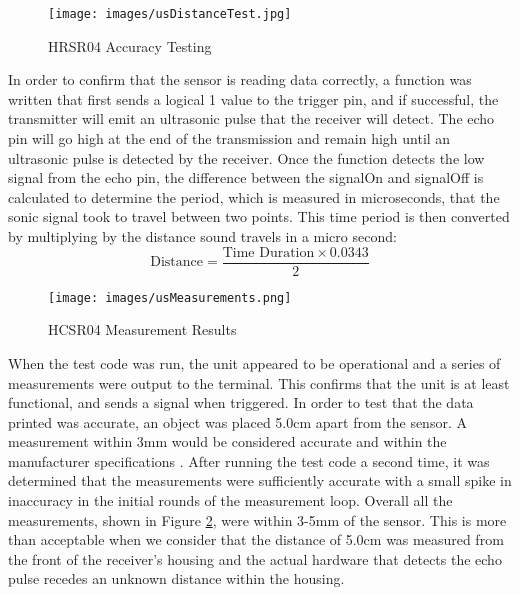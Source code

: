 \documentclass[12pt]{article} %
\begin{document}
\begin{figure}[H]
  \centering
  \texttt{[image: images/usDistanceTest.jpg]}
  \caption{HRSR04 Accuracy Testing}
  \label{fig:accuracy test}
\end{figure}

\noindent In order to confirm that the sensor is reading data correctly, a function was written that first sends a logical 1 value to the trigger pin, and if successful, the transmitter will emit an ultrasonic pulse that the receiver will detect. The echo pin will go high at the end of the transmission and remain high until an ultrasonic pulse is detected by the receiver. Once the function detects the low signal from the echo pin, the difference between the signalOn and signalOff is calculated to determine the period, which is measured in microseconds, that the sonic signal took to travel between two points. This time period is then converted by multiplying by the distance sound travels in a micro second:
\begin{equation}
\text{Distance} = \frac{\text{Time Duration} \times 0.0343}{2}
\end{equation}


\begin{figure}[H]
  \centering
  \texttt{[image: images/usMeasurements.png]}
  \caption{HCSR04 Measurement Results}
  \label{fig:HCSR04 Accuracy Test}
\end{figure}

\noindent When the test code was run, the unit appeared to be operational and a series of measurements were output to the terminal. This confirms that the unit is at least functional, and sends a signal when triggered. In order to test that the data printed was accurate, an object was placed 5.0cm apart from the sensor. A measurement within 3mm would be considered accurate and within the manufacturer specifications \cite{ref_hcsr04}. After running the test code a second time, it was determined that the measurements were sufficiently accurate with a small spike in inaccuracy in the initial rounds of the measurement loop. Overall all the measurements, shown in Figure \ref{fig:HCSR04 Accuracy Test}, were within 3-5mm of the sensor. This is more than acceptable when we consider that the distance of 5.0cm was measured from the front of the receiver’s housing and the actual hardware that detects the echo pulse recedes an unknown distance within the housing. 
\end{document}
